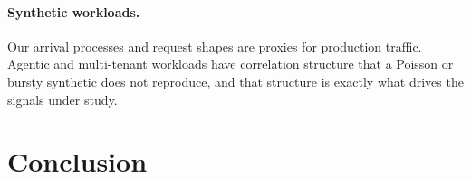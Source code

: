 \paragraph{Synthetic workloads.} Our arrival processes and request shapes are
proxies for production traffic. Agentic and multi-tenant workloads have
correlation structure that a Poisson or bursty synthetic does not reproduce, and
that structure is exactly what drives the signals under study.

\section{Conclusion}
\label{sec:conclusion}

